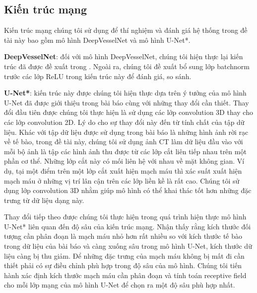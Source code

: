 \subsection{Kiến trúc mạng} 
\label{subsec:kien_truc_mạng}
	Kiến trúc mạng chúng tôi sử dụng để thí nghiệm và đánh giá hệ thống trong đề tài này bao gồm mô hình DeepVesselNet và mô hình U-Net*.
	
	\textbf{DeepVesselNet}: đối với mô hình DeepVesselNet, chúng tôi hiện thực lại kiến trúc đã được đề xuất trong \cite{tetteh2018deepvesselnet}. Ngoài ra, chúng tôi đề xuất bổ sung lớp batchnorm trước các lớp ReLU trong kiến trúc này để đánh giá, so sánh.
	
	\textbf{U-Net*}: kiến trúc này được chúng tôi hiện thực dựa trên ý tưởng của mô hình U-Net đã được giới thiệu trong bài báo \cite{ronneberger2015u} cùng với những thay đổi cần thiết. Thay đổi đầu tiên được chúng tôi thực hiện là sử dụng các lớp convolution 3D thay cho các lớp convolution 2D. Lý do cho sự thay đổi này đến từ tính chất của tập dữ liệu. Khác với tập dữ liệu được sử dụng trong bài báo là những hình ảnh rời rạc về tế bào, trong đề tài này, chúng tôi sử dụng ảnh CT làm dữ liệu đầu vào với mỗi bộ ảnh là tập các hình ảnh thu được từ các lớp cắt liên tiếp nhau trên một phần cơ thể. Những lớp cắt này có mối liên hệ với nhau về mặt không gian. Ví dụ, tại một điểm trên một lớp cắt xuất hiện mạch máu thì xác suất xuất hiện mạch máu ở những vị trí lân cận trên các lớp liền kề là rất cao. Chúng tôi sử dụng lớp convolution 3D nhằm giúp mô hình có thể khai thác tốt hơn những đặc trưng từ dữ liệu dạng này. 
	
	Thay đổi tiếp theo được chúng tôi thực hiện trong quá trình hiện thực mô hình U-Net* liên quan đến độ sâu của kiến trúc mạng. Nhận thấy rằng kích thước đối tượng cần phân đoạn là mạch máu nhỏ hơn rất nhiều so với kích thước tế bào trong dữ liệu của bài báo và càng xuống sâu trong mô hình U-Net, kích thước dữ liệu càng bị thu giảm. Để những đặc trưng của mạch máu không bị mất đi cần thiết phải có sự điều chỉnh phù hợp trong độ sâu của mô hình. Chúng tôi tiến hành xác định kích thước mạch máu cần phân đoạn và tính toán receptive field cho mỗi lớp mạng của mô hình U-Net để chọn ra một độ sâu phù hợp nhất.
	

